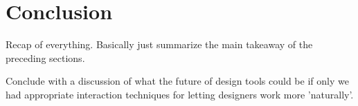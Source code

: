 \chapter{Conclusion}

\cite{gross-boe}

Recap of everything. Basically just summarize the main takeaway of the
preceding sections.

Conclude with a discussion of what the future of design tools could be
if only we had appropriate interaction techniques for letting
designers work more 'naturally'.
